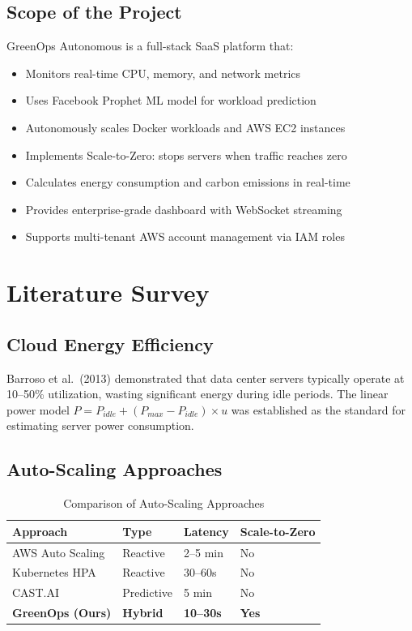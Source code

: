 \documentclass[12pt,a4paper]{report}
\begin{document}
\section{Scope of the Project}

GreenOps Autonomous is a full-stack SaaS platform that:
\begin{itemize}
    \item Monitors real-time CPU, memory, and network metrics
    \item Uses Facebook Prophet ML model for workload prediction
    \item Autonomously scales Docker workloads and AWS EC2 instances
    \item Implements Scale-to-Zero: stops servers when traffic reaches zero
    \item Calculates energy consumption and carbon emissions in real-time
    \item Provides enterprise-grade dashboard with WebSocket streaming
    \item Supports multi-tenant AWS account management via IAM roles
\end{itemize}

\chapter{Literature Survey}

\section{Cloud Energy Efficiency}

Barroso et al.\ (2013) demonstrated that data center servers typically operate at 10--50\% utilization, wasting significant energy during idle periods. The linear power model $P = P_{idle} + (P_{max} - P_{idle}) \times u$ was established as the standard for estimating server power consumption.

\section{Auto-Scaling Approaches}

\begin{table}[H]
\centering
\caption{Comparison of Auto-Scaling Approaches}
\begin{tabular}{@{}llll@{}}
\toprule
\textbf{Approach} & \textbf{Type} & \textbf{Latency} & \textbf{Scale-to-Zero} \\
\midrule
AWS Auto Scaling & Reactive & 2--5 min & No \\
Kubernetes HPA & Reactive & 30--60s & No \\
CAST.AI & Predictive & 5 min & No \\
\textbf{GreenOps (Ours)} & \textbf{Hybrid} & \textbf{10--30s} & \textbf{Yes} \\
\bottomrule
\end{tabular}
\end{table}
\end{document}
